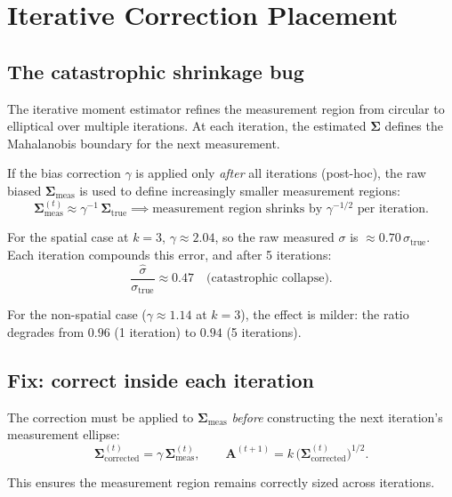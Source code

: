 \documentclass[11pt]{article}
\newcommand{\mat}[1]{\mathbf{#1}}
\begin{document}
\section{Iterative Correction Placement}

\subsection{The catastrophic shrinkage bug}

The iterative moment estimator refines the measurement region from circular to
elliptical over multiple iterations. At each iteration, the estimated
$\mat{\Sigma}$ defines the Mahalanobis boundary for the next measurement.

If the bias correction $\gamma$ is applied only \emph{after} all iterations
(post-hoc), the raw biased $\mat{\Sigma}_\text{meas}$ is used to define
increasingly smaller measurement regions:
\begin{equation}
  \mat{\Sigma}_\text{meas}^{(t)} \approx \gamma^{-1}\,\mat{\Sigma}_\text{true}
  \implies \text{measurement region shrinks by } \gamma^{-1/2} \text{ per iteration.}
\end{equation}

For the spatial case at $k = 3$, $\gamma \approx 2.04$, so the raw measured
$\sigma$ is $\approx 0.70\,\sigma_\text{true}$. Each iteration compounds this
error, and after 5 iterations:
\begin{equation}
  \frac{\hat\sigma}{\sigma_\text{true}} \approx 0.47 \quad
  \text{(catastrophic collapse)}.
\end{equation}

For the non-spatial case ($\gamma \approx 1.14$ at $k=3$), the effect is
milder: the ratio degrades from $0.96$ (1 iteration) to $0.94$ (5 iterations).

\subsection{Fix: correct inside each iteration}

The correction must be applied to $\mat{\Sigma}_\text{meas}$ \emph{before}
constructing the next iteration's measurement ellipse:
\begin{equation}
  \mat{\Sigma}^{(t)}_\text{corrected} = \gamma\,\mat{\Sigma}^{(t)}_\text{meas},
  \qquad
  \mat{A}^{(t+1)} = k\,\bigl(\mat{\Sigma}^{(t)}_\text{corrected}\bigr)^{1/2}.
\end{equation}

This ensures the measurement region remains correctly sized across iterations.
\end{document}
